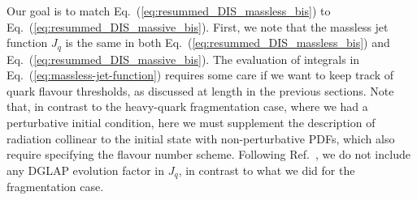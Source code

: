 \documentclass[letterpaper,11pt]{article}
\begin{document}
Our goal is to match Eq.~(\ref{eq:resummed_DIS_massless_bis}) to Eq.~(\ref{eq:resummed_DIS_massive_bis}).
%
First, we note that the massless jet function $J_q$ is the same in both Eq.~(\ref{eq:resummed_DIS_massless_bis}) and Eq.~(\ref{eq:resummed_DIS_massive_bis}). 
%
The evaluation of integrals in Eq.~(\ref{eq:massless-jet-function}) requires some care if we want to keep track of quark flavour thresholds, as discussed at length in the previous sections.
%
Note that, in contrast to the heavy-quark fragmentation case, where we had a perturbative initial condition, here we must supplement the description of radiation collinear to the initial state with non-perturbative PDFs, which also require specifying the flavour number scheme. Following Ref.~\cite{Corcella:2003ib}, we do not include any DGLAP evolution factor in $J_q$, in contrast to what we did for the fragmentation case. 
\end{document}
